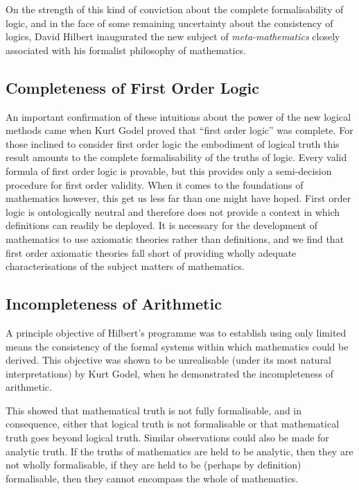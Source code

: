 On the strength of this kind of conviction about the complete formalisability of logic, and in the face of some remaining uncertainty about the consistency of logics, David Hilbert inaugurated the new subject of {\it meta-mathematics} closely associated with his formalist philosophy of mathematics.

\subsection{Completeness of First Order Logic}

An important confirmation of these intuitions about the power of the new logical methods came when Kurt Godel proved that ``first order logic'' was complete.
For those inclined to consider first order logic the embodiment of logical truth this result amounts to the complete formalisability of the truths of logic.
Every valid formula of first order logic is provable, but this provides only a semi-decision procedure for first order validity.
When it comes to the foundations of mathematics however, this get us less far than one might have hoped.
First order logic is ontologically neutral and therefore does not provide a context in which definitions can readily be deployed.
It is necessary for the development of mathematics to use axiomatic theories rather than definitions, and we find that first order axiomatic theories fall short of providing wholly adequate characterisations of the subject matters of mathematics.

\subsection{Incompleteness of Arithmetic}

A principle objective of Hilbert's programme was to establish using only limited means the consistency of the formal systems within which mathematics could be derived.
This objective was shown to be unrealisable (under its most natural interpretations) by Kurt Godel, when he demonstrated the incompleteness of arithmetic.

This showed that mathematical truth is not fully formalisable, and in consequence, either that logical truth is not formalisable or that mathematical truth goes beyond logical truth.
Similar observations could also be made for analytic truth.
If the truths of mathematics are held to be analytic, then they are not wholly formalisable, if they are held to be (perhaps by definition) formalisable, then they cannot encompass the whole of mathematics.

